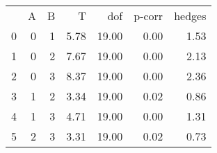 \begin{tabular}{lrrrrrr}
 & A & B & T & dof & p-corr & hedges \\
0 & 0 & 1 & 5.78 & 19.00 & 0.00 & 1.53 \\
1 & 0 & 2 & 7.67 & 19.00 & 0.00 & 2.13 \\
2 & 0 & 3 & 8.37 & 19.00 & 0.00 & 2.36 \\
3 & 1 & 2 & 3.34 & 19.00 & 0.02 & 0.86 \\
4 & 1 & 3 & 4.71 & 19.00 & 0.00 & 1.31 \\
5 & 2 & 3 & 3.31 & 19.00 & 0.02 & 0.73 \\
\end{tabular}

